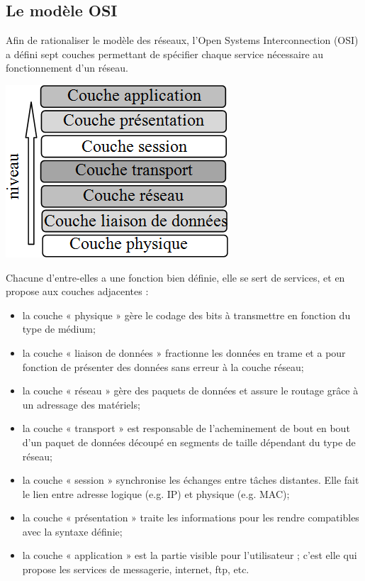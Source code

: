 \documentclass[10pt]{article}
\begin{document}
\subsection{Le modèle OSI}

\begin{minipage}[c]{.68\linewidth}
Afin de rationaliser le modèle des réseaux, l’Open Systems Interconnection (OSI) a défini sept couches permettant de spécifier chaque service nécessaire au fonctionnement d’un réseau.
\end{minipage} \hfill
\begin{minipage}[c]{.3\linewidth}
\begin{center}
\includegraphics[width=.95\textwidth]{images/fig_12}
\end{center}
\end{minipage} 

Chacune d’entre-elles a une fonction bien définie, elle se sert de services, et en propose aux couches adjacentes : 
\begin{itemize}
\item la couche « physique » gère le codage des bits à transmettre en fonction du type de médium;
\item la couche « liaison de données » fractionne les données en trame et a pour fonction de présenter des données sans erreur à la couche réseau;
\item la couche « réseau » gère des paquets de données et assure le routage grâce à un adressage des matériels;
\item la couche « transport » est responsable de l’acheminement de bout en bout d’un paquet de données découpé en segments de taille dépendant du type de réseau;
\item la couche « session » synchronise les échanges entre tâches distantes. Elle fait le lien entre adresse logique (e.g. IP) et physique (e.g. MAC);
\item la couche « présentation » traite les informations pour les rendre compatibles avec la syntaxe définie;
\item la couche « application » est la partie visible pour l’utilisateur ; c’est elle qui propose les services de messagerie, internet, ftp, etc.
\end{itemize}
\end{document}
